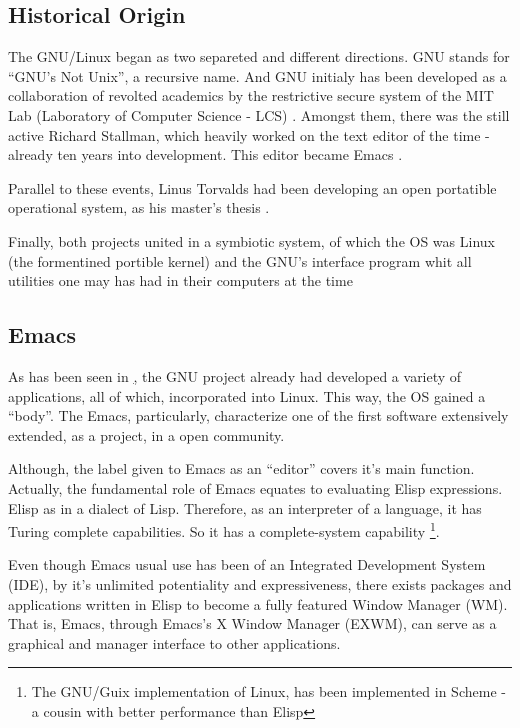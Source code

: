 \documentclass[
12pt,				%
openright,			%
oneside,			%
a4paper,			%
brazil,				%
english,			  %
]{abntex2}
\begin{document}
\subsection{\label{sec:linux-origin}Historical Origin}

The GNU/Linux began as two separeted and different directions. GNU
stands for ``GNU's Not Unix'', a recursive name. And GNU initialy has
been developed as a collaboration of revolted academics by the
restrictive secure system of the MIT Lab (Laboratory of Computer
Science - LCS) \cite{stallman2002my,emacswiki2021history}. Amongst
them, there was the still active Richard Stallman, which heavily
worked on the text editor of the time - already ten years into
development. This editor became Emacs \cite{emacswiki2021history}.   

Parallel to these events, Linus Torvalds had been developing an open portatible
operational system, as his master's thesis
\cite{torvalds1997linux}.

Finally, both projects united in a symbiotic system, of which the OS
was Linux (the formentined portible kernel) and the GNU's interface
program whit all utilities one may has had in their computers at the
time \cite{stallman1997}  

\subsection{Emacs}

As has been seen in \href{sec:linux-origin}, the GNU project already
had developed a variety of applications, all of which, incorporated
into Linux. This way, the OS gained a ``body''. The Emacs,
particularly, characterize one of the first software extensively
extended, as a project, in a open community.

Although, the label given to Emacs as an ``editor'' covers it's main
function. Actually, the fundamental role of Emacs equates to
evaluating Elisp expressions. Elisp as in a dialect of
Lisp. Therefore, as an interpreter of a language, it has Turing
complete capabilities. So it has a complete-system capability
\footnote{The GNU/Guix implementation of Linux, has been implemented
  in Scheme - a cousin with better performance than Elisp}.      

Even though Emacs usual use has been of an Integrated Development
System (IDE), by it's unlimited potentiality and expressiveness, there
exists packages and applications written in Elisp to become a fully
featured Window Manager (WM). That is, Emacs, through Emacs's X Window
Manager (EXWM), can serve as a graphical and manager interface to
other applications. 
\end{document}

